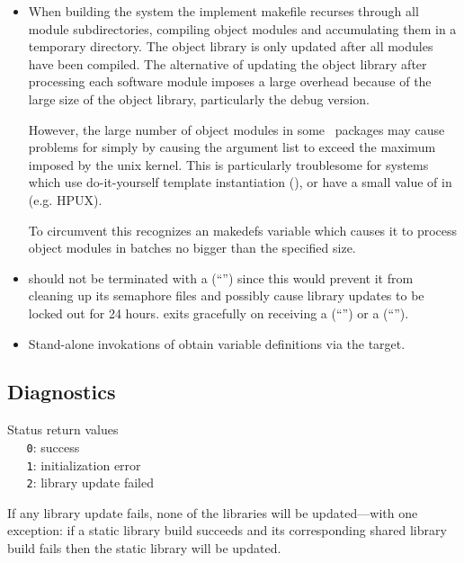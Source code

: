 \begin{itemize}
\item
   When building the system the implement makefile recurses through all module
   subdirectories, compiling object modules and accumulating them in a
   temporary directory.  The object library is only updated after all modules
   have been compiled.  The alternative of updating the object library after
   processing each software module imposes a large overhead because of the
   large size of the object library, particularly the debug version.
 
   However, the large number of object modules in some \aipspp\ packages may
   cause problems for  simply by causing the argument list to
   exceed the maximum imposed by the unix kernel.  This is particularly
   troublesome for systems which use do-it-yourself template instantiation 
   (), or have a small value of 
   in  (e.g. HPUX).

   To circumvent this  recognizes an  makedefs
   variable which causes it to process object modules in batches no bigger
   than the specified size.
\item
    should not be terminated with a 
   (``'') since this would prevent it from cleaning up its
   semaphore files and possibly cause library updates to be locked out for 24
   hours.   exits gracefully on receiving a 
   (``'') or a  (``'').
\item
   Stand-alone invokations of  obtain  variable
   definitions via the  target.
\end{itemize}

\subsection*{Diagnostics}

Status return values
\\ \verb+   0+: success
\\ \verb+   1+: initialization error
\\ \verb+   2+: library update failed

\noindent
If any library update fails, none of the libraries will be
updated---with one exception: if a static library build succeeds and its
corresponding shared library build fails then the static library will be
updated.

